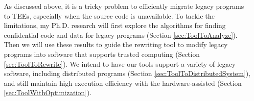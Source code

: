 As discussed above, it is a tricky problem to efficiently migrate legacy programs to TEEs,
especially when the source code is unavailable. To tackle the limitations,
my Ph.D. research will first explore the algorithms for finding confidential code and data
for legacy programs (Section \ref{sec:ToolToAnalyze}). Then we will use these results
to guide the rewriting tool to modify legacy programs into software that
supports trusted computing (Section \ref{sec:ToolToRewrite}). We intend to have
our tools support a variety of legacy software, including distributed programs
(Section \ref{sec:ToolToDistributedSystem}), and still maintain high execution efficiency
with the hardware-assisted (Section \ref{sec:ToolWithOptimization}).
